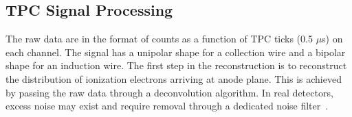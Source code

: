 
\subsection{TPC Signal Processing}\label{sec:tpc_sp}

The raw data are in the format of  counts as a function of TPC ticks (0.5 $\mu$s) on each channel. The signal has a 
unipolar shape for a collection wire and a bipolar shape for an induction wire. The first step 
in the reconstruction is to reconstruct the distribution of ionization electrons arriving at anode plane. 
This is achieved by passing the raw data through a deconvolution algorithm. In real detectors, excess 
noise may exist and require removal %
through a dedicated noise filter~\cite{Acciarri:2017sde}. 

